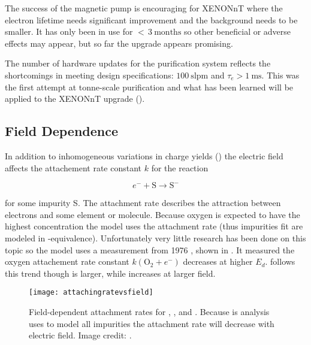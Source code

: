 The success of the magnetic pump is encouraging for XENONnT where the electron lifetime needs significant improvement and the background
needs to be smaller.  It has only been in use for ${<}\, 3\ \mathrm{months}$ so other beneficial or adverse effects may appear, but so
far the upgrade appears promising.

The number of hardware updates for the purification system reflects the shortcomings in meeting design specifications:
$100\ \mathrm{slpm}$ and $\tau_e > 1\ \mathrm{ms}$.  This was the first attempt at tonne-scale purification and what has been learned will
be applied to the XENONnT upgrade ().



\subsection{Field Dependence}
\label{subsec:electron_lifetime_model_field}
In addition to inhomogeneous variations in charge yields () the electric field affects
the attachement rate constant $k$ for the reaction

\vspace{-15pt}

\begin{equation}
e^- + \mathrm{S} \rightarrow \mathrm{S^-}
\end{equation}

\vspace{-10pt}

\noindent for some impurity S.  The attachment rate describes the attraction between electrons and some element or molecule.  Because
oxygen is expected to have the highest concentration the model uses the  attachment rate (thus impurities fit are modeled
in -equivalence).  Unfortunately very little research has been done on this topic so the model uses a measurement from
1976 , shown in .  It measured the oxygen attachement rate
constant $k(\mathrm{O_2} + e^-)$ decreases at higher $E_d$.   follows this trend though is larger, while
 increases at larger field.

\begin{figure}
\centering
\texttt{[image: attachingratevsfield]}
\caption{Field-dependent attachment rates for , , and .  Because is analysis uses  to model all
impurities the attachment rate will decrease with electric field.  Image credit: .}
\label{fig:electron_lifetime_model_field_attaching_rate}
\end{figure}

